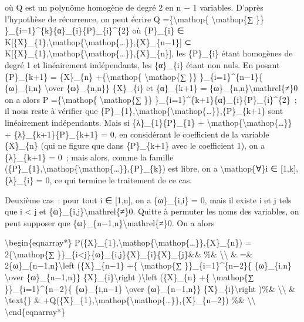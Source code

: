 \documentclass[]{article}
\begin{document}
où Q est un polynôme homogène de degré 2 en n − 1 variables. D'après
l'hypothèse de récurrence, on peut écrire Q =\{\textbackslash{}mathop\{
\textbackslash{}mathop\{∑ \}\}
\}\_\{i=1\}\^{}\{k\}\{α\}\_\{i\}\{P\}\_\{i\}\^{}\{2\} où \{P\}\_\{i\} ∈
K{[}\{X\}\_\{1\},\textbackslash{}mathop\{\textbackslash{}mathop\{\ldots{}\}\},\{X\}\_\{n−1\}{]}
⊂
K{[}\{X\}\_\{1\},\textbackslash{}mathop\{\textbackslash{}mathop\{\ldots{}\}\},\{X\}\_\{n\}{]},
les \{P\}\_\{i\} étant homogènes de degré 1 et linéairement
indépendants, les \{α\}\_\{i\} étant non nuls. En posant \{P\}\_\{k+1\}
= \{X\}\_\{n\} +\{\textbackslash{}mathop\{ \textbackslash{}mathop\{∑
\}\} \}\_\{i=1\}\^{}\{n−1\}\{ \{ω\}\_\{i,n\} \textbackslash{}over
\{ω\}\_\{n,n\}\} \{X\}\_\{i\} et \{α\}\_\{k+1\} =
\{ω\}\_\{n,n\}\textbackslash{}mathrel\{≠\}0 on a alors P
=\{\textbackslash{}mathop\{ \textbackslash{}mathop\{∑ \}\}
\}\_\{i=1\}\^{}\{k+1\}\{α\}\_\{i\}\{P\}\_\{i\}\^{}\{2\}~; il nous reste
à vérifier que
\{P\}\_\{1\},\textbackslash{}mathop\{\textbackslash{}mathop\{\ldots{}\}\},\{P\}\_\{k+1\}
sont linéairement indépendants. Mais si \{λ\}\_\{1\}\{P\}\_\{1\} +
\textbackslash{}mathop\{\textbackslash{}mathop\{\ldots{}\}\} +
\{λ\}\_\{k+1\}\{P\}\_\{k+1\} = 0, en considérant le coefficient de la
variable \{X\}\_\{n\} (qui ne figure que dans \{P\}\_\{k+1\} avec le
coefficient 1), on a \{λ\}\_\{k+1\} = 0~; mais alors, comme la famille
(\{P\}\_\{1\},\textbackslash{}mathop\{\textbackslash{}mathop\{\ldots{}\}\},\{P\}\_\{k\})
est libre, on a \textbackslash{}mathop\{∀\}i ∈ {[}1,k{]}, \{λ\}\_\{i\} =
0, ce qui termine le traitement de ce cas.

Deuxième cas~: pour tout i ∈ {[}1,n{]}, on a \{ω\}\_\{i,i\} = 0, mais il
existe i et j tels que i \textless{} j et
\{ω\}\_\{i,j\}\textbackslash{}mathrel\{≠\}0. Quitte à permuter les noms
des variables, on peut supposer que
\{ω\}\_\{n−1,n\}\textbackslash{}mathrel\{≠\}0. On a alors

\textbackslash{}begin\{eqnarray*\}
P(\{X\}\_\{1\},\textbackslash{}mathop\{\textbackslash{}mathop\{\ldots{}\}\},\{X\}\_\{n\})
= 2\{\textbackslash{}mathop\{∑
\}\}\_\{i\textless{}j\}\{ω\}\_\{i,j\}\{X\}\_\{i\}\{X\}\_\{j\}\&\& \%\&
\textbackslash{}\textbackslash{} \& =\&
2\{ω\}\_\{n−1,n\}\textbackslash{}left (\{X\}\_\{n−1\} +\{
\textbackslash{}mathop\{∑ \}\}\_\{i=1\}\^{}\{n−2\}\{ \{ω\}\_\{i,n\}
\textbackslash{}over \{ω\}\_\{n−1,n\}\}
\{X\}\_\{i\}\textbackslash{}right )\textbackslash{}left (\{X\}\_\{n\}
+\{ \textbackslash{}mathop\{∑ \}\}\_\{i=1\}\^{}\{n−2\}\{
\{ω\}\_\{i,n−1\} \textbackslash{}over \{ω\}\_\{n−1,n\}\}
\{X\}\_\{i\}\textbackslash{}right )\%\& \textbackslash{}\textbackslash{}
\& \textbackslash{}text\{\} \&
+Q(\{X\}\_\{1\},\textbackslash{}mathop\{\textbackslash{}mathop\{\ldots{}\}\},\{X\}\_\{n−2\})
\%\& \textbackslash{}\textbackslash{} \textbackslash{}end\{eqnarray*\}
\end{document}
